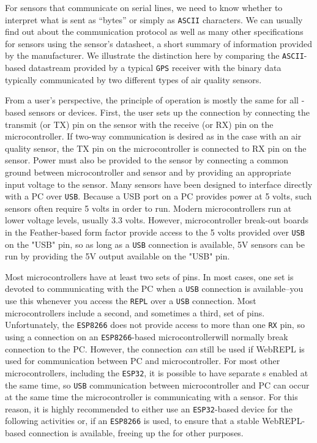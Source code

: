 For sensors that communicate on serial lines, we need to know whether to interpret what is sent as “bytes” or simply as \texttt{ASCII} characters.
We can usually find out about the communication protocol as well as many other specifications for sensors using the sensor's datasheet, a short summary of information provided by the manufacturer.
We illustrate the distinction here by comparing the \texttt{ASCII}-based datastream provided by a typical \texttt{GPS} receiver with the binary data typically communicated by two different types of air quality sensors.  

From a user's perspective, the principle of operation is mostly the same for all \uart -based sensors or devices.
First, the user sets up the \uart connection by connecting the transmit (or TX) pin on the sensor with the receive (or RX) pin on the microcontroller.
If two-way communication is desired as in the case with an air quality sensor, the TX pin on the microcontroller is connected to RX pin on the sensor.
Power must also be provided to the sensor by connecting a common ground between microcontroller and sensor and by providing an appropriate input voltage to the sensor.
Many sensors have been designed to interface directly with a PC over \texttt{USB}.
Because a USB port on a PC provides power at 5 volts, such sensors often require 5 volts in order to run.
Modern microcontrollers run at lower voltage levels, usually 3.3 volts.
However, microcontroller break-out boards in the Feather-based form factor provide access to the 5 volts provided over \texttt{USB} on the "USB" pin, so as long as a \texttt{USB} connection is available, 5V sensors can be run by providing the 5V output available on the "USB" pin.

\begin{kaobox}[frametitle=The \texttt{ESP8266} \uart Gotcha!]
Most microcontrollers have at least two sets of \uart pins.
In most cases, one set is devoted to communicating with the PC when a \texttt{USB} connection is available--you use this whenever you access the \Micropython \texttt{REPL} over a \texttt{USB} connection.
Most microcontrollers include a second, and sometimes a third, set of \uart pins.
Unfortunately, the \texttt{ESP8266} does not provide access to more than one \texttt{RX} pin, so using a \uart connection on an \texttt{ESP8266}-based microcontrollerwill normally break connection to the PC.
However, the \uart connection \emph{can} still be used if WebREPL is used for communication between PC and microcontroller.
For most other microcontrollers, including the \texttt{ESP32}, it is possible to have separate \uart s enabled at the same time, so \texttt{USB} communication between microcontroller and PC can occur at the same time the microcontroller is communicating with a sensor.
For this reason, it is highly recommended to either use an \texttt{ESP32}-based device for the following activities or, if an \texttt{ESP8266} is used, to ensure that a stable WebREPL-based connection is available, freeing up the \uart for other purposes.
\end{kaobox}

